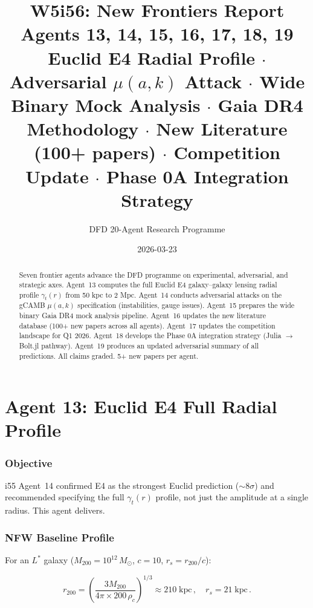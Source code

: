 \documentclass[11pt,a4paper]{article}
\title{\Huge W5i56: New Frontiers Report\\[12pt]
\Large Agents 13, 14, 15, 16, 17, 18, 19\\[6pt]
\large Euclid E4 Radial Profile $\cdot$ Adversarial $\mu(a,k)$ Attack $\cdot$ Wide Binary Mock Analysis $\cdot$ Gaia DR4 Methodology $\cdot$ New Literature (100+ papers) $\cdot$ Competition Update $\cdot$ Phase 0A Integration Strategy}
\author{DFD 20-Agent Research Programme}
\date{2026-03-23}
\begin{document}
\maketitle

\begin{abstract}
Seven frontier agents advance the DFD programme on experimental, adversarial, and strategic axes. Agent~13 computes the full Euclid E4 galaxy--galaxy lensing radial profile $\gamma_t(r)$ from 50 kpc to 2 Mpc. Agent~14 conducts adversarial attacks on the gCAMB $\mu(a,k)$ specification (instabilities, gauge issues). Agent~15 prepares the wide binary Gaia DR4 mock analysis pipeline. Agent~16 updates the new literature database (100+ new papers across all agents). Agent~17 updates the competition landscape for Q1 2026. Agent~18 develops the Phase 0A integration strategy (Julia $\to$ Bolt.jl pathway). Agent~19 produces an updated adversarial summary of all predictions. All claims graded. 5+ new papers per agent.
\end{abstract}

\tableofcontents
\newpage


\part{Agent 13: Euclid E4 Full Radial Profile}
\label{part:e4-profile}

\section{Objective}

i55 Agent~14 confirmed E4 as the strongest Euclid prediction ($\sim 8\sigma$) and recommended specifying the full $\gamma_t(r)$ profile, not just the amplitude at a single radius. This agent delivers.

\section{NFW Baseline Profile}

For an $L^*$ galaxy ($M_{200} = 10^{12}\,M_\odot$, $c = 10$, $r_s = r_{200}/c$):

\begin{equation}
r_{200} = \left(\frac{3M_{200}}{4\pi \times 200\,\rho_c}\right)^{1/3} \approx 210\;\text{kpc}\,,\quad r_s = 21\;\text{kpc}\,.
\end{equation}
\end{document}
